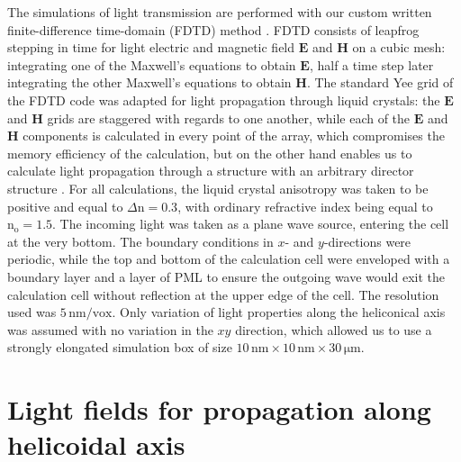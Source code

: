 \documentclass{osa-article}
\renewcommand{\vec}[1]{\mathbf{#1}}
\begin{document}
The simulations of light transmission are performed with our custom written finite-difference time-domain (FDTD) method \cite{TafloveA_2000, TafloveA_2013}. 
FDTD consists of leapfrog stepping in time for light electric and magnetic field $\vec{E}$ and $\vec{H}$ on a cubic mesh: 
integrating one of the Maxwell's equations to obtain $\vec{E}$, half a time step later integrating the other Maxwell's equations to obtain $\vec{H}$. 
The standard Yee grid of the FDTD code was adapted for light propagation through liquid crystals: the $\vec{E}$ and $\vec{H}$ grids are staggered with regards to one another, 
while each of the $\vec{E}$ and $\vec{H}$ components is calculated in every point of the array, 
which compromises the memory efficiency of the calculation, but on the other hand enables us to calculate light propagation through a structure with an arbitrary director structure \cite{CanculaM_PhysRevE90_2014}. 
For all calculations, the liquid crystal anisotropy was taken to be positive and equal to $\Delta \mathrm{n} = 0.3$, with ordinary refractive index being equal to $\mathrm{n_o}=1.5$.
The incoming light was taken as a plane wave source, entering the cell at the very bottom. 
The boundary conditions in $x$- and $y$-directions were periodic, 
while the top and bottom of the calculation cell were enveloped with a boundary layer and a layer of PML \cite{TafloveA_2000} 
to ensure the outgoing wave would exit the calculation cell without reflection at the upper edge of the cell. 
The resolution used was $5 \,\mathrm{nm}/\mathrm{vox}$. 
Only variation of light properties along the heliconical axis was assumed with no variation in the $xy$ direction, 
which allowed us to use a strongly elongated simulation box of size $10 \, \mathrm{nm} \times 10 \, \mathrm{nm} \times 30 \, \mathrm{\mu m}$.


\section{Light fields for propagation along helicoidal axis}
\end{document}
